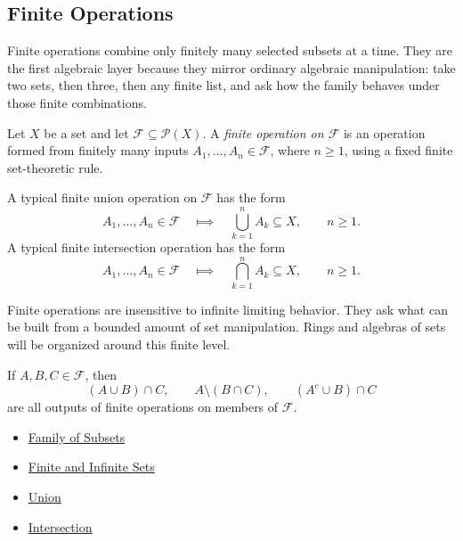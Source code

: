 \subsection{Finite Operations}

\begin{remark*}[Exposition]
Finite operations combine only finitely many selected subsets at a time.
They are the first algebraic layer because they mirror ordinary algebraic
manipulation: take two sets, then three, then any finite list, and ask how the
family behaves under those finite combinations.
\end{remark*}

\begin{definition}\label{def:finite-operation-on-family}
Let \(X\) be a set and let \(\mathcal{F}\subseteq\mathcal{P}(X)\).  A
\emph{finite operation on \(\mathcal{F}\)} is an operation formed from finitely
many inputs \(A_1,\dots,A_n\in\mathcal{F}\), where \(n\geq 1\), using a fixed
finite set-theoretic rule.
\end{definition}

\begin{remark*}
A typical finite union operation on \(\mathcal{F}\) has the form
\[
  A_1,\dots,A_n\in\mathcal{F}
  \quad\Longmapsto\quad
  \bigcup_{k=1}^{n}A_k\subseteq X,
  \qquad n\geq 1.
\]
A typical finite intersection operation has the form
\[
  A_1,\dots,A_n\in\mathcal{F}
  \quad\Longmapsto\quad
  \bigcap_{k=1}^{n}A_k\subseteq X,
  \qquad n\geq 1.
\]
\end{remark*}

\begin{remark*}[Interpretation]
Finite operations are insensitive to infinite limiting behavior.  They ask
what can be built from a bounded amount of set manipulation.  Rings and
algebras of sets will be organized around this finite level.
\end{remark*}

\begin{remark*}[Examples]
If \(A,B,C\in\mathcal{F}\), then
\[
  (A\cup B)\cap C,
  \qquad
  A\setminus(B\cap C),
  \qquad
  (A^c\cup B)\cap C
\]
are all outputs of finite operations on members of \(\mathcal{F}\).
\end{remark*}

\begin{dependencies}
\begin{itemize}
  \item \hyperref[def:family-of-subsets]{Family of Subsets}
  \item \hyperref[def:finite-infinite]{Finite and Infinite Sets}
  \item \hyperref[def:union]{Union}
  \item \hyperref[def:intersection]{Intersection}
\end{itemize}
\end{dependencies}
